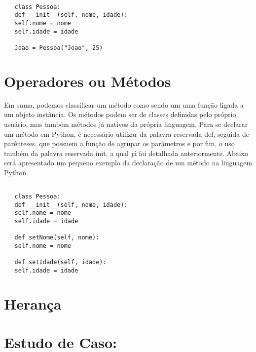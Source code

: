    \begin{lstlisting} 
   	  	
   class Pessoa:
   def __init__(self, nome, idade):
   self.nome = nome
   self.idade = idade
   
   Joao = Pessoa("Joao", 25)
\end{lstlisting}

    \section{Operadores ou M\'{e}todos}
Em suma, podemos classificar um método como sendo um uma função ligada a um objeto instância. Os métodos podem ser de classes definidas pelo próprio usuário, mas também métodos já nativos da própria linguagem. Para se declarar um método em Python, é necessário utilizar da palavra reservada def, seguida de parênteses, que possuem a função de agrupar os parâmetros e por fim, o uso também da palavra reservada init, a qual já foi detalhada anteriormente. Abaixo será apresentado um pequeno exemplo da declaração de um método na linguagem Python.
 
   \begin{lstlisting} 
	
   class Pessoa:
   def __init__(self, nome, idade):
   self.nome = nome
   self.idade = idade

   def setNome(self, nome):
   self.nome = nome

   def setIdade(self, idade):
   self.idade = idade

\end{lstlisting}

    \section{Heran\c{c}a}


    \section{Estudo de Caso: }
